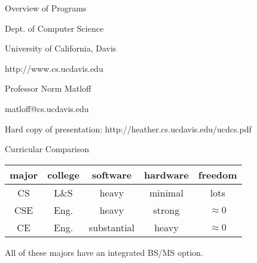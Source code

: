 \documentclass[%
pdf,
colorBG,
slideColor,
azure
]{prosper}
\begin{document}
\begin{slide}{Overview of Programs}

Dept. of Computer Science

University of California, Davis

http://www.cs.ucdavis.edu

\bigskip

Professor Norm Matloff 

matloff@cs.ucdavis.edu

\bigskip

Hard copy of presentation:
http://heather.cs.ucdavis.edu/ucdcs.pdf 

\end{slide}


\begin{slide}{Curricular Comparison}


{\centering \begin{tabular}{|c|c|c|c|c|}

\hline
major & college & software & hardware & freedom \\ \hline
\hline
CS & L\&S & heavy & minimal & lots \\ \hline
CSE & Eng. & heavy & strong & $\approx 0$ \\ \hline
CE & Eng. & substantial & heavy & $\approx 0$ \\ \hline

\end{tabular}\par}

\bigskip

All of these majors have an integrated BS/MS option.

\end{slide}
\end{document}
